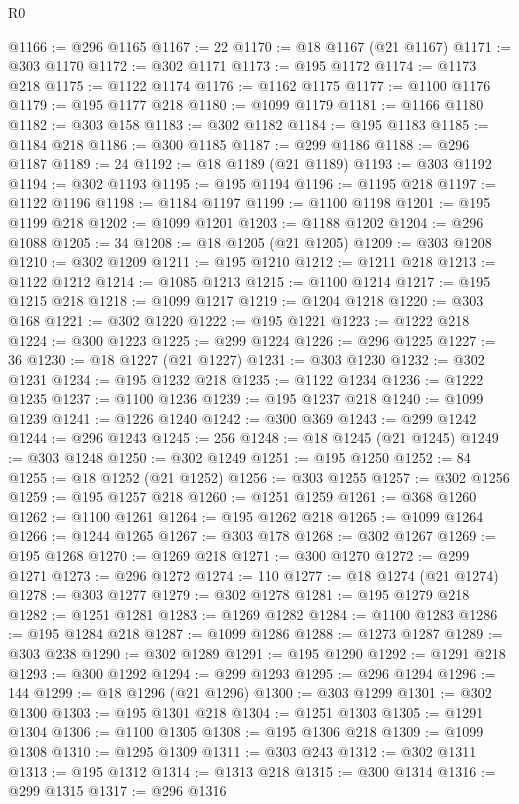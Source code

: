 \begin{lexlean}{R0}
\begin{coremodule}
@1166 := @296 @1165
@1167 := 22
@1170 := @18 @1167 (@21 @1167)
@1171 := @303 @1170
@1172 := @302 @1171
@1173 := @195 @1172
@1174 := @1173 @218
@1175 := @1122 @1174
@1176 := @1162 @1175
@1177 := @1100 @1176
@1179 := @195 @1177 @218
@1180 := @1099 @1179
@1181 := @1166 @1180
@1182 := @303 @158
@1183 := @302 @1182
@1184 := @195 @1183
@1185 := @1184 @218
@1186 := @300 @1185
@1187 := @299 @1186
@1188 := @296 @1187
@1189 := 24
@1192 := @18 @1189 (@21 @1189)
@1193 := @303 @1192
@1194 := @302 @1193
@1195 := @195 @1194
@1196 := @1195 @218
@1197 := @1122 @1196
@1198 := @1184 @1197
@1199 := @1100 @1198
@1201 := @195 @1199 @218
@1202 := @1099 @1201
@1203 := @1188 @1202
@1204 := @296 @1088
@1205 := 34
@1208 := @18 @1205 (@21 @1205)
@1209 := @303 @1208
@1210 := @302 @1209
@1211 := @195 @1210
@1212 := @1211 @218
@1213 := @1122 @1212
@1214 := @1085 @1213
@1215 := @1100 @1214
@1217 := @195 @1215 @218
@1218 := @1099 @1217
@1219 := @1204 @1218
@1220 := @303 @168
@1221 := @302 @1220
@1222 := @195 @1221
@1223 := @1222 @218
@1224 := @300 @1223
@1225 := @299 @1224
@1226 := @296 @1225
@1227 := 36
@1230 := @18 @1227 (@21 @1227)
@1231 := @303 @1230
@1232 := @302 @1231
@1234 := @195 @1232 @218
@1235 := @1122 @1234
@1236 := @1222 @1235
@1237 := @1100 @1236
@1239 := @195 @1237 @218
@1240 := @1099 @1239
@1241 := @1226 @1240
@1242 := @300 @369
@1243 := @299 @1242
@1244 := @296 @1243
@1245 := 256
@1248 := @18 @1245 (@21 @1245)
@1249 := @303 @1248
@1250 := @302 @1249
@1251 := @195 @1250
@1252 := 84
@1255 := @18 @1252 (@21 @1252)
@1256 := @303 @1255
@1257 := @302 @1256
@1259 := @195 @1257 @218
@1260 := @1251 @1259
@1261 := @368 @1260
@1262 := @1100 @1261
@1264 := @195 @1262 @218
@1265 := @1099 @1264
@1266 := @1244 @1265
@1267 := @303 @178
@1268 := @302 @1267
@1269 := @195 @1268
@1270 := @1269 @218
@1271 := @300 @1270
@1272 := @299 @1271
@1273 := @296 @1272
@1274 := 110
@1277 := @18 @1274 (@21 @1274)
@1278 := @303 @1277
@1279 := @302 @1278
@1281 := @195 @1279 @218
@1282 := @1251 @1281
@1283 := @1269 @1282
@1284 := @1100 @1283
@1286 := @195 @1284 @218
@1287 := @1099 @1286
@1288 := @1273 @1287
@1289 := @303 @238
@1290 := @302 @1289
@1291 := @195 @1290
@1292 := @1291 @218
@1293 := @300 @1292
@1294 := @299 @1293
@1295 := @296 @1294
@1296 := 144
@1299 := @18 @1296 (@21 @1296)
@1300 := @303 @1299
@1301 := @302 @1300
@1303 := @195 @1301 @218
@1304 := @1251 @1303
@1305 := @1291 @1304
@1306 := @1100 @1305
@1308 := @195 @1306 @218
@1309 := @1099 @1308
@1310 := @1295 @1309
@1311 := @303 @243
@1312 := @302 @1311
@1313 := @195 @1312
@1314 := @1313 @218
@1315 := @300 @1314
@1316 := @299 @1315
@1317 := @296 @1316

\end{coremodule}
\end{lexlean}
